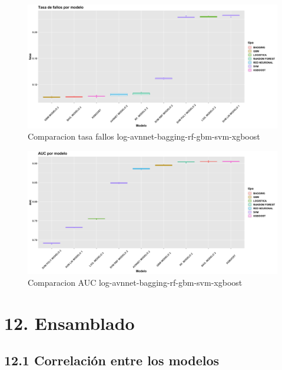 \documentclass[
]{article}
\begin{document}
\begin{figure}[h!]

{\centering \includegraphics[width=0.99\linewidth,height=0.99\textheight,]{./charts/comparativas/07_log_avnnet_bagging_rf_gbm_svm_xgboost_tasa} 

}

\caption{Comparacion tasa fallos log-avnnet-bagging-rf-gbm-svm-xgboost}\label{fig:unnamed-chunk-137}
\end{figure}
\begin{figure}[h!]

{\centering \includegraphics[width=0.99\linewidth,height=0.99\textheight,]{./charts/comparativas/07_log_avnnet_bagging_rf_gbm_svm_xgboost_auc} 

}

\caption{Comparacion AUC log-avnnet-bagging-rf-gbm-svm-xgboost}\label{fig:unnamed-chunk-138}
\end{figure}

\hypertarget{ensamblado}{%
\section{12. Ensamblado}\label{ensamblado}}

\hypertarget{correlaciuxf3n-entre-los-modelos}{%
\subsection{12.1 Correlación entre los
modelos}\label{correlaciuxf3n-entre-los-modelos}}
\end{document}
